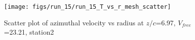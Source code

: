 \begin{figure}[H]
\centering
\texttt{[image: figs/run\_15/run\_15\_T\_vs\_r\_mesh\_scatter]}
\caption{Scatter plot of azimuthal velocity vs radius at $z/c$=6.97, $V_{free}$=23.21, station2}
\label{fig:run_15_T_vs_r_mesh_scatter}
\end{figure}


